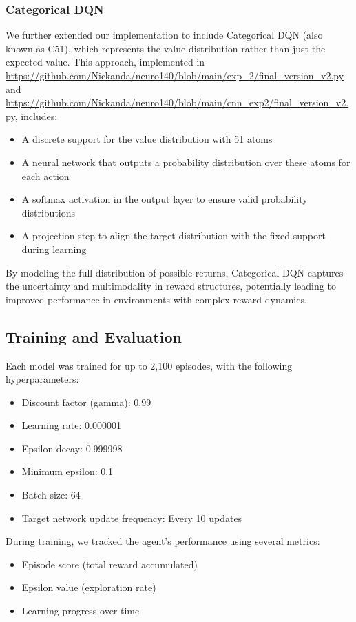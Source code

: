 \documentclass{article} %
\begin{document}
\subsubsection{Categorical DQN}

We further extended our implementation to include Categorical DQN (also known as C51), which represents the value distribution rather than just the expected value. This approach, implemented in \url{https://github.com/Nickanda/neuro140/blob/main/exp_2/final_version_v2.py} and \url{https://github.com/Nickanda/neuro140/blob/main/cnn_exp2/final_version_v2.py}, includes:
\begin{itemize}
  \item A discrete support for the value distribution with 51 atoms
  \item A neural network that outputs a probability distribution over these atoms for each action
  \item A softmax activation in the output layer to ensure valid probability distributions
  \item A projection step to align the target distribution with the fixed support during learning
\end{itemize}

By modeling the full distribution of possible returns, Categorical DQN captures the uncertainty and multimodality in reward structures, potentially leading to improved performance in environments with complex reward dynamics.

\subsection{Training and Evaluation}

Each model was trained for up to 2,100 episodes, with the following hyperparameters:
\begin{itemize}
  \item Discount factor (gamma): 0.99
  \item Learning rate: 0.000001
  \item Epsilon decay: 0.999998
  \item Minimum epsilon: 0.1
  \item Batch size: 64
  \item Target network update frequency: Every 10 updates
\end{itemize}

During training, we tracked the agent's performance using several metrics:
\begin{itemize}
  \item Episode score (total reward accumulated)
  \item Epsilon value (exploration rate)
  \item Learning progress over time
\end{itemize}
\end{document}
